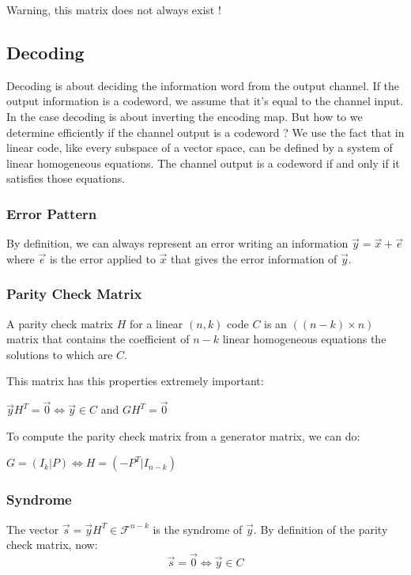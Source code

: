 \documentclass{article}
\begin{document}
\begin{tcolorbox}[width=12.1cm, leftrule=3mm]
Warning, this matrix does not always exist !
\end{tcolorbox}

\subsection{Decoding}
Decoding is about deciding the information word from the output channel. If the output information is a codeword, we assume that it's equal to the channel input. In the case decoding is about inverting the encoding map. But how to we determine efficiently if the channel output is a codeword ? We use the fact that in linear code, like every subspace of a vector space, can be defined by a system of linear homogeneous equations. The channel output is a codeword if and only if it satisfies those equations.

\subsubsection{Error Pattern}
By definition, we can always represent an error writing an information $ \vec{y} = \vec{x} + \vec{e} $ where $ \vec{e} $ is the error applied to $ \vec{x} $ that gives the error information of $ \vec{y} $.

\subsubsection{Parity Check Matrix}
A parity check matrix $ H $ for a linear $ (n,k) $ code $ C $ is an $ ((n-k)\times n) $ matrix that contains the coefficient of $ n-k $ linear homogeneous equations the solutions to which are $ C $.

This matrix has this properties extremely important:
\begin{tcolorbox}[width=12.1cm, leftrule=3mm]
$ \vec{y}H^T = \vec{0} \Leftrightarrow \vec{y} \in C $ and $ GH^T = \vec{0} $
\end{tcolorbox}
To compute the parity check matrix from a generator matrix, we can do:
\begin{tcolorbox}[width=12.1cm, leftrule=3mm]
$ G = (I_{k} | P) \Leftrightarrow H = (-P^T | I_{n-k}) $
\end{tcolorbox}

\subsubsection{Syndrome}
\begin{tcolorbox}[sharp corners, colback=green!30, colframe=green!80!blue, title=Syndrome of an element]
The vector $ \vec{s} = \vec{y}H^T \in \mathcal{F}^{n-k} $ is the syndrome of $ \vec{y} $. By definition of the parity check matrix, now: 
\begin{equation}
\vec{s} = \vec{0} \Leftrightarrow \vec{y} \in C
\end{equation}
\end{tcolorbox}
\end{document}
